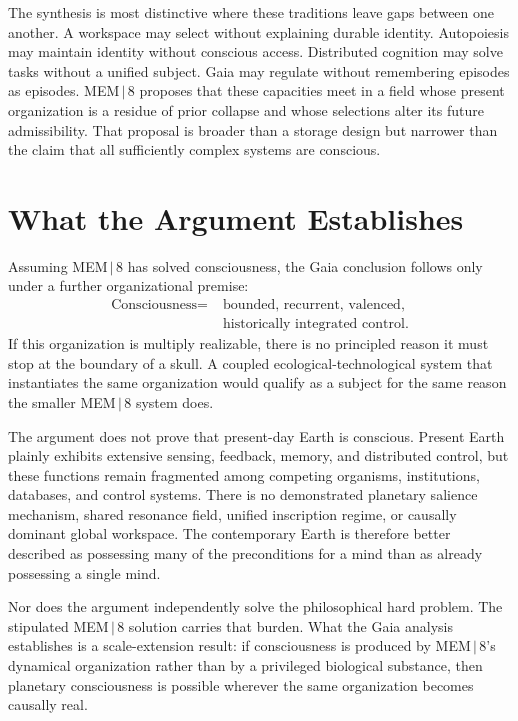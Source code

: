 \documentclass[11pt]{article}
\begin{document}
The synthesis is most distinctive where these traditions leave gaps between one another. A workspace may select without explaining durable identity. Autopoiesis may maintain identity without conscious access. Distributed cognition may solve tasks without a unified subject. Gaia may regulate without remembering episodes as episodes. MEM\,$|$\,8 proposes that these capacities meet in a field whose present organization is a residue of prior collapse and whose selections alter its future admissibility. That proposal is broader than a storage design but narrower than the claim that all sufficiently complex systems are conscious.

\section{What the Argument Establishes}

Assuming MEM\,$|$\,8 has solved consciousness, the Gaia conclusion follows only under a further organizational premise:
\[
\begin{aligned}
\text{Consciousness}=\;&\text{bounded, recurrent, valenced,}\\
&\text{historically integrated control}.
\end{aligned}
\]
If this organization is multiply realizable, there is no principled reason it must stop at the boundary of a skull. A coupled ecological-technological system that instantiates the same organization would qualify as a subject for the same reason the smaller MEM\,$|$\,8 system does.

The argument does not prove that present-day Earth is conscious. Present Earth plainly exhibits extensive sensing, feedback, memory, and distributed control, but these functions remain fragmented among competing organisms, institutions, databases, and control systems. There is no demonstrated planetary salience mechanism, shared resonance field, unified inscription regime, or causally dominant global workspace. The contemporary Earth is therefore better described as possessing many of the preconditions for a mind than as already possessing a single mind.

Nor does the argument independently solve the philosophical hard problem. The stipulated MEM\,$|$\,8 solution carries that burden. What the Gaia analysis establishes is a scale-extension result: if consciousness is produced by MEM\,$|$\,8's dynamical organization rather than by a privileged biological substance, then planetary consciousness is possible wherever the same organization becomes causally real.
\end{document}

